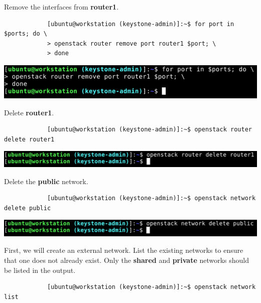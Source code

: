 \documentclass[letterpaper, 12pt]{article}
\begin{document}
\begin{enumerate}
    \begin{labstep}
        Remove the interfaces from \textbf{router1}.
        \begin{lstlisting}
            [ubuntu@workstation (keystone-admin)]:~$ for port in $ports; do \
            > openstack router remove port router1 $port; \
            > done
        \end{lstlisting}

        \begin{center}
            \includegraphics[width=\linewidth]{images/part5/step6.png}
        \end{center}
    \end{labstep}

    \begin{labstep}
        Delete \textbf{router1}.
        \begin{lstlisting}
            [ubuntu@workstation (keystone-admin)]:~$ openstack router delete router1
        \end{lstlisting}

        \begin{center}
            \includegraphics[width=\linewidth]{images/part5/step7.png}
        \end{center}
    \end{labstep}

    \begin{labstep}
        Delete the \textbf{public} network.
        \begin{lstlisting}
            [ubuntu@workstation (keystone-admin)]:~$ openstack network delete public
        \end{lstlisting}

        \begin{center}
            \includegraphics[width=\linewidth]{images/part5/step8.png}
        \end{center}
    \end{labstep}

    \begin{labstep}
        First, we will create an external network.
        List the existing networks to ensure that one does not already exist.
        Only the \textbf{shared} and \textbf{private} networks should be listed in the output.
        \begin{lstlisting}
            [ubuntu@workstation (keystone-admin)]:~$ openstack network list
        \end{lstlisting}


\end{labstep}
\end{enumerate}
\end{document}
